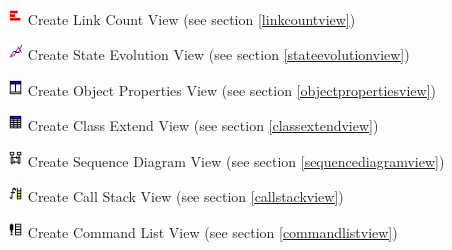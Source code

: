 \documentclass[a4paper,titlepage,oneside,final]{scrreprt} %
\begin{document}
\begin{description}
\item \includegraphics[width=0.03\textwidth]{Pictures/LinkCountView.png} Create Link Count View (see section \ref{linkcountview})
\item \includegraphics[width=0.03\textwidth]{Pictures/LineChartView.png} Create State Evolution View (see section \ref{stateevolutionview})
\item \includegraphics[width=0.03\textwidth]{Pictures/ObjectProperties.png} Create Object Properties View (see section \ref{objectpropertiesview})
\item \includegraphics[width=0.03\textwidth]{Pictures/ClassExtendView.png} Create Class Extend View (see section \ref{classextendview})
\item \includegraphics[width=0.03\textwidth]{Pictures/SequenceDiagram.png} Create Sequence Diagram View (see section \ref{sequencediagramview})
\item \includegraphics[width=0.03\textwidth]{Pictures/CallStack.png} Create Call Stack View (see section \ref{callstackview})
\item \includegraphics[width=0.03\textwidth]{Pictures/CmdList.png} Create Command List View (see section \ref{commandlistview})
\end{description}
\end{document}

